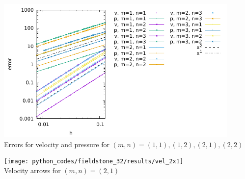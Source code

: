 \begin{center}
\includegraphics[width=12cm]{python_codes/fieldstone_32/results/errors}\\
{\captionfont Errors for velocity and pressure for $(m,n)=(1,1),(1,2),(2,1),(2,2)$ }
\end{center}


\begin{center}
\texttt{[image: python\_codes/fieldstone\_32/results/vel\_2x1]}\\
{\captionfont Velocity arrows for $(m,n)=(2,1)$}
\end{center}

